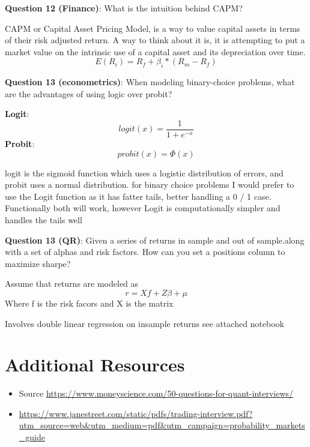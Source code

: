 \documentclass[a4paper,10pt]{article}
\begin{document}
\vspace{0.5cm}
\noindent
\textbf{Question 12 (Finance)}: What is the intuition behind CAPM?
\vspace{0.25cm}
\noindent
\begin{sloppypar}
    CAPM or Capital Asset Pricing Model, is a way to value capital assets in terms of their risk adjusted return.
    A way to think about it is, it is attempting to put a market value on the intrinsic use of a capital asset and its depreciation over time. 
    $$ E(R_i) = R_f + \beta_{i} * (R_m - R_f)$$

\end{sloppypar}
\vspace{.5cm}
\noindent
\textbf{Question 13 (econometrics)}: When modeling binary-choice problems, what are the advantages of using logic over probit?
\vspace{.25cm}
\noindent
\begin{sloppypar}
    \noindent
    \textbf{Logit}:
    $$ logit(x) = \frac{1}{1+e^{-x}}$$
    \textbf{Probit}:
    $$ probit(x) = \Phi(x) $$

    logit is the sigmoid function which uses a logistic distribution of errors, and probit uses a normal distribution. 
    for binary choice problems I would prefer to use the Logit function as it has fatter tails, better handling a 0 / 1 case. 
    Functionally both will work, however Logit is computationally simpler and handles the tails well
\end{sloppypar}


\textbf{Question 13 (QR)}: Given a series of returns in sample and out of sample.along with a set of alphas and risk factors. How can you set a positions column to maximize sharpe?
\vspace{.25cm}
\noindent
\begin{sloppypar}
    Assume that returns are modeled as 
    $$ r = Xf + Z \beta  + \mu $$
    Where f is the risk facors and X is the matrix

    Involves double linear regression on insample returns {see attached notebook}
\end{sloppypar}





\section*{Additional Resources}
\begin{itemize}
    \item {Source \url{https://www.moneyscience.com/50-questions-for-quant-interviews/}}
    \sloppy
    \item \url{https://www.janestreet.com/static/pdfs/trading-interview.pdf?utm_source=web&utm_medium=pdf&utm_campaign=probability_markets_guide}
\end {itemize}
\end{document}
